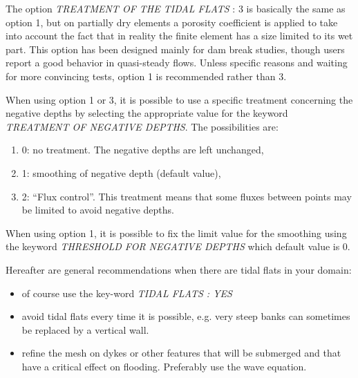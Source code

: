  The option \textit{TREATMENT OF THE TIDAL FLATS} : 3 is basically the same as option 1, but on partially dry elements a porosity coefficient is applied to take into account the fact that in reality the finite element has a size limited to its wet part. This option has been designed mainly for dam break studies, though users report a good behavior in quasi-steady flows. Unless specific reasons and waiting for more convincing tests, option 1 is recommended rather than 3.

 When using option 1 or 3, it is possible to use a specific treatment concerning the negative depths by selecting the appropriate value for the keyword \textit{TREATMENT OF NEGATIVE DEPTHS}. The possibilities are:

\begin{enumerate}
\item [\nonumber] 0: no treatment. The negative depths are left unchanged,

\item [\nonumber] 1: smoothing of negative depth (default value),

\item [\nonumber] 2: ``Flux control''. This treatment means that some fluxes between points may be limited to avoid negative depths.
\end{enumerate}

 When using option 1, it is possible to fix the limit value for the smoothing using the keyword \textit{THRESHOLD FOR NEGATIVE DEPTHS} which default value is 0.

 Hereafter are general recommendations when there are tidal flats in your domain:

\begin{itemize}
\item  of course use the key-word \textit{TIDAL FLATS : YES}

\item  avoid tidal flats every time it is possible, e.g. very steep banks can sometimes be replaced by a vertical wall.

\item  refine the mesh on dykes or other features that will be submerged and that have a critical effect on flooding. Preferably use the wave equation.
\end{itemize}

